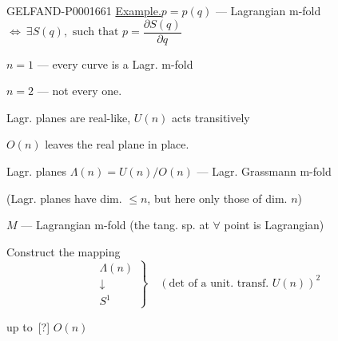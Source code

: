 \begin{GelfandAdjacentEvidence}{GELFAND-P000166}{1}
\underline{Example.}\quad $p=p (q)$ --- Lagrangian m-fold $\Longleftrightarrow\ \exists S (q),\text{ such that }p=\dfrac{\partial S (q)}{\partial q}$

$n=1$ --- every curve is a Lagr. m-fold

$n=2$ --- not every one.


Lagr. planes are real-like, $U (n)$ acts transitively

$O (n)$ leaves the real plane in place.

Lagr. planes $\Lambda (n)=U (n)/O (n)$ --- Lagr. Grassmann m-fold

(Lagr. planes have dim. $\leq n$, but here only those of dim. $n$)


$M$ --- Lagrangian m-fold (the tang. sp. at $\forall$ point is Lagrangian)


Construct the mapping
\begin{equation*}
\left.\begin{array}{c}\Lambda (n)\\\downarrow\\S^1\end{array}\right\}
\quad (\mathrm{det}\text{ of a unit. transf. }U (n))^2
\end{equation*}
\end{GelfandAdjacentEvidence}


up to\, [?] $O (n)$

